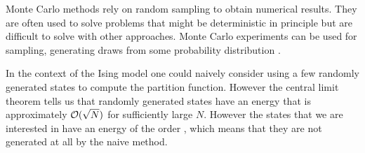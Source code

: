 
Monte Carlo methods rely on random sampling to obtain numerical results. They are often used to solve problems that might be deterministic in principle but are difficult to solve with other approaches. Monte Carlo experiments can be used for sampling, \ie generating draws from some probability distribution \cite{kroese2014monte}. 

In the context of the Ising model one could naively consider using a few randomly generated states to compute the partition function. However the central limit theorem tells us that randomly generated states have an energy that is approximately $\mathcal{O}(\sqrt{N})$ for sufficiently large $N$. However the states that we are interested in have an energy of the order , which means that they are not generated at all by the naive method. 

